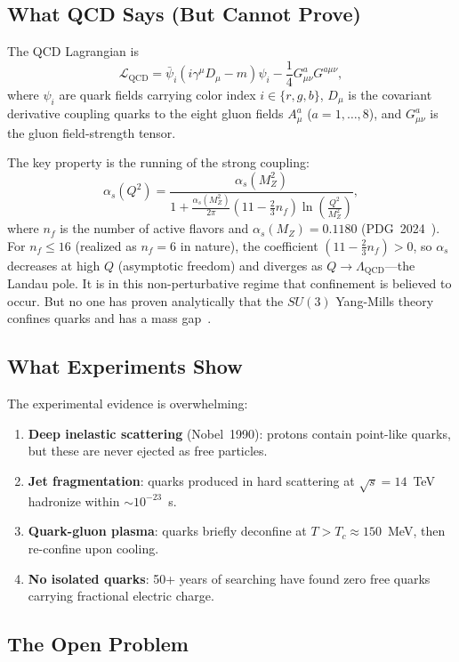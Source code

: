 \documentclass[
  aps,
  prd,
  twocolumn,
  superscriptaddress,
  nofootinbib,
  floatfix
]{revtex4-2}
\newcommand{\beq}{\begin{equation}}
\newcommand{\eeq}{\end{equation}}
\newcommand{\LQCD}{\Lambda_{\mathrm{QCD}}}
\begin{document}
\subsection{What QCD Says (But Cannot Prove)}

The QCD Lagrangian is
\beq\label{eq:qcd}
  \mathcal{L}_{\mathrm{QCD}} = \bar{\psi}_i
  (i\gamma^\mu D_\mu - m)\psi_i
  - \frac{1}{4} G^a_{\mu\nu} G^{a\mu\nu},
\eeq
where $\psi_i$ are quark fields carrying color index
$i \in \{r,g,b\}$, $D_\mu$ is the covariant derivative coupling
quarks to the eight gluon fields $A^a_\mu$ ($a = 1,\ldots,8$),
and $G^a_{\mu\nu}$ is the gluon field-strength tensor.

The key property is the running of the strong coupling:
\beq\label{eq:running}
  \alpha_s(Q^2) = \frac{\alpha_s(M_Z^2)}
    {1 + \frac{\alpha_s(M_Z^2)}{2\pi}
    (11 - \tfrac{2}{3}n_f) \ln\!\left(\frac{Q^2}{M_Z^2}\right)},
\eeq
where $n_f$ is the number of active flavors and
$\alpha_s(M_Z) = 0.1180$ (PDG~2024~\cite{pdg2024}).  For
$n_f \leq 16$ (realized as $n_f = 6$ in nature), the coefficient
$(11 - \frac{2}{3}n_f) > 0$, so $\alpha_s$ decreases at high $Q$
(asymptotic freedom) and diverges as $Q \to \LQCD$---the Landau
pole.  It is in this non-perturbative regime that confinement is
believed to occur.  But no one has proven analytically that the
$SU(3)$ Yang-Mills theory confines quarks and has a mass
gap~\cite{jaffe2006quantum}.

\subsection{What Experiments Show}

The experimental evidence is overwhelming:
\begin{enumerate}
\item \textbf{Deep inelastic scattering} (Nobel~1990): protons
  contain point-like quarks, but these are never ejected as free
  particles.
\item \textbf{Jet fragmentation}: quarks produced in hard
  scattering at $\sqrt{s} = 14$~TeV hadronize within
  $\sim 10^{-23}$~s.
\item \textbf{Quark-gluon plasma}: quarks briefly deconfine at
  $T > T_c \approx 150$~MeV, then re-confine upon cooling.
\item \textbf{No isolated quarks}: 50+ years of searching have
  found zero free quarks carrying fractional electric charge.
\end{enumerate}

\subsection{The Open Problem}
\end{document}
